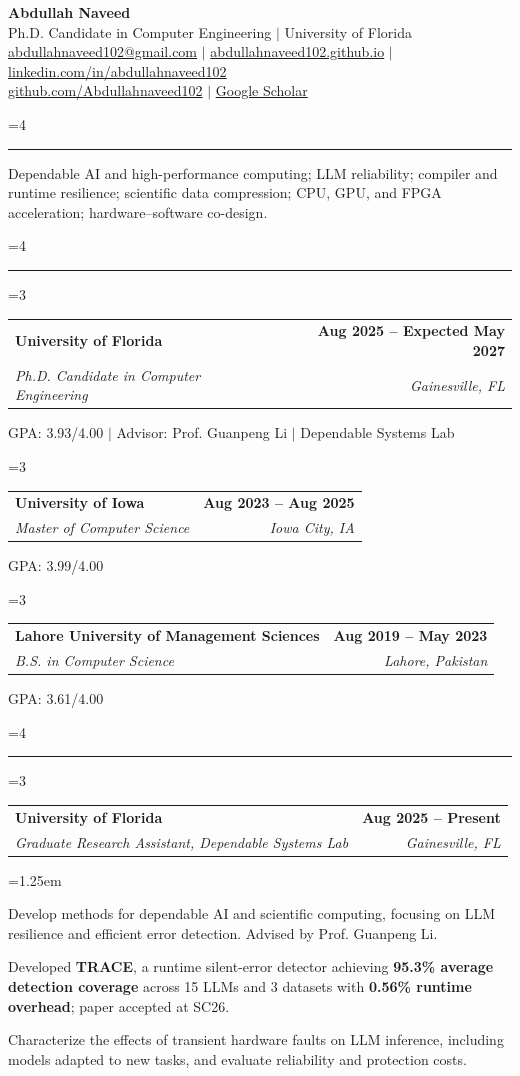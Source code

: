 \documentclass[10pt,letterpaper]{article}
\makeatletter
\newcommand{\needspace}[1]{\par\begingroup\dimen0=#1\relax\ifdim\dimexpr\pagegoal-\pagetotal\relax<\dimen0\vfil\break\fi\endgroup}
\renewcommand{\section}[1]{\needspace{4\baselineskip}\vspace{.82em}{\normalsize\bfseries #1\par}\vspace{.16em}\hrule\vspace{.38em}}
\newenvironment{cvitems}{\begin{list}{\textbullet}{\leftmargin=1.25em\itemsep=1.5pt\topsep=1pt\parsep=0pt\partopsep=0pt}}{\end{list}\vspace{.18em}}
\newcommand{\cventry}[4]{\needspace{3\baselineskip}\begin{tabularx}{\textwidth}{@{}Xr@{}}\textbf{#1}&\textbf{#2}\\\textit{#3}&\textit{#4}\end{tabularx}\vspace{-.20em}}
\newcommand{\cvdetail}[1]{{\small #1\par}\vspace{.38em}}
\makeatother
\begin{document}
\begin{center}
  {\LARGE\bfseries Abdullah Naveed}\\[3pt]
  {\normalsize Ph.D. Candidate in Computer Engineering $\mid$ University of Florida}\\[5pt]
  {\footnotesize
    \href{mailto:abdullahnaveed102@gmail.com}{abdullahnaveed102@gmail.com}
    \quad $\vert$ \quad
    \href{https://abdullahnaveed102.github.io/}{abdullahnaveed102.github.io}
    \quad $\vert$ \quad
    \href{https://www.linkedin.com/in/abdullahnaveed102}{linkedin.com/in/abdullahnaveed102}
  }\\[3pt]
  {\footnotesize
    \href{https://github.com/Abdullahnaveed102}{github.com/Abdullahnaveed102}
    \quad $\vert$ \quad
    \href{https://scholar.google.com/citations?user=LL4EX88AAAAJ}{Google Scholar}
  }
\end{center}
\vspace{-.5em}

\section{Research Interests}
Dependable AI and high-performance computing; LLM reliability; compiler and runtime resilience; scientific data compression; CPU, GPU, and FPGA acceleration; hardware--software co-design.

\section{Education}
\cventry{University of Florida}{Aug 2025 -- Expected May 2027}{Ph.D. Candidate in Computer Engineering}{Gainesville, FL}
\cvdetail{GPA: 3.93/4.00 \quad $\vert$ \quad Advisor: Prof. Guanpeng Li \quad $\vert$ \quad Dependable Systems Lab}
\cventry{University of Iowa}{Aug 2023 -- Aug 2025}{Master of Computer Science}{Iowa City, IA}
\cvdetail{GPA: 3.99/4.00}
\cventry{Lahore University of Management Sciences}{Aug 2019 -- May 2023}{B.S. in Computer Science}{Lahore, Pakistan}
\cvdetail{GPA: 3.61/4.00}

\section{Research Experience}
\cventry{University of Florida}{Aug 2025 -- Present}{Graduate Research Assistant, Dependable Systems Lab}{Gainesville, FL}
\begin{cvitems}
  \item Develop methods for dependable AI and scientific computing, focusing on LLM resilience and efficient error detection. Advised by Prof. Guanpeng Li.
  \item Developed \textbf{TRACE}, a runtime silent-error detector achieving \textbf{95.3\% average detection coverage} across 15 LLMs and 3 datasets with \textbf{0.56\% runtime overhead}; paper accepted at SC26.
  \item Characterize the effects of transient hardware faults on LLM inference, including models adapted to new tasks, and evaluate reliability and protection costs.
\end{cvitems}
\end{document}
